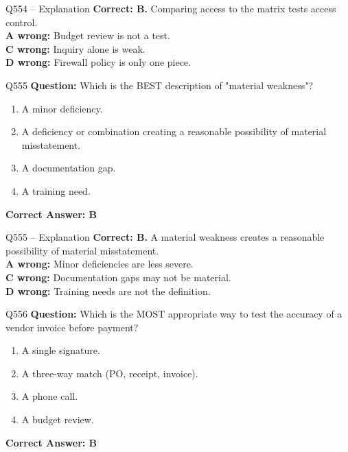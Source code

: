 \documentclass[aspectratio=169,10pt]{beamer}
\begin{document}
	\begin{frame}[t]{Q554 -- Explanation}
		\small
		\textbf{Correct: B.} Comparing access to the matrix tests access control. \\[4pt]
		\textbf{A wrong:} Budget review is not a test. \\[2pt]
		\textbf{C wrong:} Inquiry alone is weak. \\[2pt]
		\textbf{D wrong:} Firewall policy is only one piece.
	\end{frame}
	
	\begin{frame}[t]{Q555}
		\small
		\textbf{Question:} Which is the BEST description of "material weakness"?
		\begin{enumerate}[label=\Alph*.,itemsep=1pt,topsep=2pt]
			\item A minor deficiency.
			\item A deficiency or combination creating a reasonable possibility of material misstatement.
			\item A documentation gap.
			\item A training need.
		\end{enumerate}
		\vspace{4pt}
		\textbf{Correct Answer: B}
	\end{frame}
	
	\begin{frame}[t]{Q555 -- Explanation}
		\small
		\textbf{Correct: B.} A material weakness creates a reasonable possibility of material misstatement. \\[4pt]
		\textbf{A wrong:} Minor deficiencies are less severe. \\[2pt]
		\textbf{C wrong:} Documentation gaps may not be material. \\[2pt]
		\textbf{D wrong:} Training needs are not the definition.
	\end{frame}
	
	\begin{frame}[t]{Q556}
		\small
		\textbf{Question:} Which is the MOST appropriate way to test the accuracy of a vendor invoice before payment?
		\begin{enumerate}[label=\Alph*.,itemsep=1pt,topsep=2pt]
			\item A single signature.
			\item A three-way match (PO, receipt, invoice).
			\item A phone call.
			\item A budget review.
		\end{enumerate}
		\vspace{4pt}
		\textbf{Correct Answer: B}
	\end{frame}
	
\end{document}
